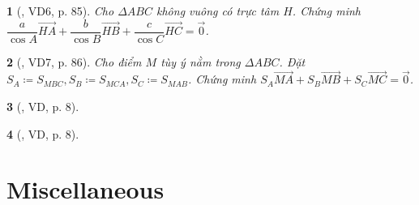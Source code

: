 \documentclass{article}
\newtheorem{baitoan}{}
\begin{document}
\begin{baitoan}[\cite{Hai_Hung_Thu_Tung_ncpt_Toan_10_tap_2}, VD6, p. 85]
	Cho $\Delta ABC$ không vuông có trực tâm $H$. Chứng minh $\dfrac{a}{\cos A}\overrightarrow{HA} + \dfrac{b}{\cos B}\overrightarrow{HB} + \dfrac{c}{\cos C}\overrightarrow{HC} = \vec{0}$.
\end{baitoan}

\begin{baitoan}[\cite{Hai_Hung_Thu_Tung_ncpt_Toan_10_tap_2}, VD7, p. 86]
	Cho điểm $M$ tùy ý nằm trong $\Delta ABC$. Đặt $S_A\coloneqq S_{MBC},S_B\coloneqq S_{MCA},S_C\coloneqq S_{MAB}$. Chứng minh $S_A\overrightarrow{MA} + S_B\overrightarrow{MB} + S_C\overrightarrow{MC} = \vec{0}$.
\end{baitoan}

\begin{baitoan}[\cite{Hai_Hung_Thu_Tung_ncpt_Toan_10_tap_2}, VD, p. 8]
	
\end{baitoan}

\begin{baitoan}[\cite{Hai_Hung_Thu_Tung_ncpt_Toan_10_tap_2}, VD, p. 8]
	
\end{baitoan}


\section{Miscellaneous}


\printbibliography[heading=bibintoc]
	
\end{document}
